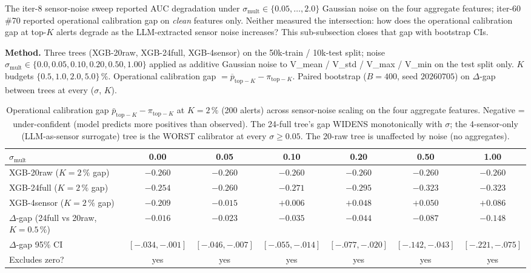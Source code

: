 \documentclass{article}
\begin{document}
The iter-8 sensor-noise sweep reported AUC degradation under
$\sigma_{\mathrm{mult}} \in \{0.05, \ldots, 2.0\}$ Gaussian noise on the
four aggregate features; iter-60 \#70 reported operational calibration
gap on \emph{clean} features only. Neither measured the intersection:
how does the operational calibration gap at top-$K$ alerts degrade as
the LLM-extracted sensor noise increases? This sub-subsection closes
that gap with bootstrap CIs.

\noindent\textbf{Method.} Three trees (XGB-20raw, XGB-24full,
XGB-4sensor) on the 50k-train / 10k-test split; noise
$\sigma_{\mathrm{mult}} \in \{0.0, 0.05, 0.10, 0.20, 0.50, 1.00\}$
applied as additive Gaussian noise to V\_mean / V\_std / V\_max / V\_min
on the test split only. $K$ budgets $\{0.5, 1.0, 2.0, 5.0\}\,\%$.
Operational calibration gap $= \overline{p}_{\mathrm{top-}K} -
\pi_{\mathrm{top-}K}$. Paired bootstrap ($B{=}400$, seed $20260705$)
on $\Delta$-gap between trees at every ($\sigma$, $K$).

\begin{table}[t]
\centering\small
\caption{Operational calibration gap
$\bar p_{\mathrm{top-}K} - \pi_{\mathrm{top-}K}$ at $K{=}2\,\%$
(200 alerts) across sensor-noise scaling on the four aggregate
features. Negative = under-confident (model predicts more positives
than observed). The 24-full tree's gap WIDENS monotonically with
$\sigma$; the 4-sensor-only (LLM-as-sensor surrogate) tree is the
WORST calibrator at every $\sigma \geq 0.05$. The 20-raw tree is
unaffected by noise (no aggregates).}
\label{tab:p8-calib-noise}
\begin{tabular}{lcccccc}
\toprule
$\sigma_{\mathrm{mult}}$ & 0.00 & 0.05 & 0.10 & 0.20 & 0.50 & 1.00 \\
\midrule
XGB-20raw  ($K{=}2\,\%$ gap)  & $-0.260$ & $-0.260$ & $-0.260$ & $-0.260$ & $-0.260$ & $-0.260$ \\
XGB-24full ($K{=}2\,\%$ gap)  & $-0.254$ & $-0.260$ & $-0.271$ & $-0.295$ & $-0.323$ & $-0.323$ \\
XGB-4sensor ($K{=}2\,\%$ gap) & $-0.209$ & $-0.015$ & $+0.006$ & $+0.048$ & $+0.050$ & $+0.086$ \\
\midrule
$\Delta$-gap (24full vs 20raw, $K{=}0.5\,\%$) & $-0.016$ & $-0.023$ & $-0.035$ & $-0.044$ & $-0.087$ & $-0.148$ \\
$\Delta$-gap 95\% CI & $[-.034, -.001]$ & $[-.046, -.007]$ & $[-.055, -.014]$ & $[-.077, -.020]$ & $[-.142, -.043]$ & $[-.221, -.075]$ \\
Excludes zero? & yes & yes & yes & yes & yes & yes \\
\bottomrule
\end{tabular}
\end{table}
\end{document}
